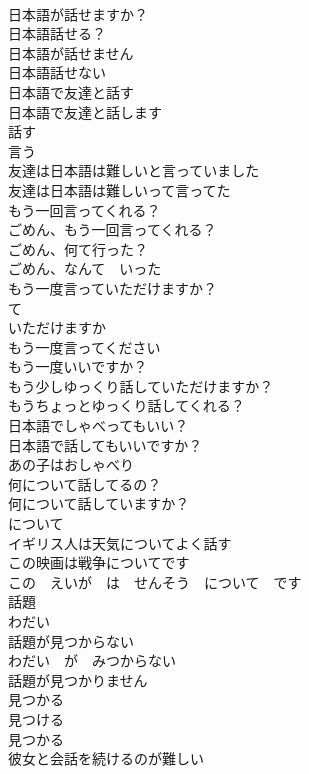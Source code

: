 \documentclass[8pt]{extreport}
\begin{document}
\begin{CJK}{UTF8}{min}
\\	日本語が話せますか？	
\\	日本語話せる？	
\\	日本語が話せません	
\\	日本語話せない	
\\	日本語で友達と話す	
\\	日本語で友達と話します	
\\	話す	
\\	言う	
\\	友達は日本語は難しいと言っていました	
\\	友達は日本語は難しいって言ってた	
\\	もう一回言ってくれる？	
\\	ごめん、もう一回言ってくれる？	
\\	ごめん、何て行った？	
\\	ごめん、なんて　いった
\\	もう一度言っていただけますか？	
\\	て
\\	いただけますか 
\\	もう一度言ってください	
\\	もう一度いいですか？	
\\	もう少しゆっくり話していただけますか？	
\\	もうちょっとゆっくり話してくれる？	
\\	日本語でしゃべってもいい？	
\\	日本語で話してもいいですか？	
\\	あの子はおしゃべり	
\\	何について話してるの？	
\\	何について話していますか？	
\\	について 
\\	イギリス人は天気についてよく話す	
\\	この映画は戦争についてです	
\\	この　えいが　は　せんそう　について　です
\\	話題	
\\	わだい	
\\	話題が見つからない	
\\	わだい　が　みつからない
\\	話題が見つかりません	
\\	見つかる	
\\	見つける 
\\	見つかる 
\\	彼女と会話を続けるのが難しい	

\end{CJK}
\end{document}
